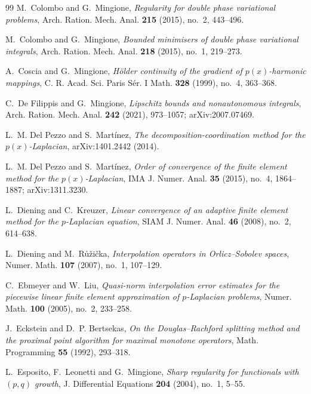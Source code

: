 \documentclass[11pt]{amsart}
\theoremstyle{definition}
\theoremstyle{remark}
\numberwithin{equation}{section}
\begin{document}
\begin{thebibliography}{99}
M.~Colombo and G.~Mingione, \emph{Regularity for double phase variational problems}, Arch. Ration. Mech. Anal. \textbf{215} (2015), no.~2, 443--496.

M.~Colombo and G.~Mingione, \emph{Bounded minimisers of double phase variational integrals}, Arch. Ration. Mech. Anal. \textbf{218} (2015), no.~1, 219--273.

A.~Coscia and G.~Mingione, \emph{H\"older continuity of the gradient of $p(x)$-harmonic mappings}, C. R. Acad. Sci. Paris S\'er. I Math. \textbf{328} (1999), no.~4, 363--368.

C.~De Filippis and G.~Mingione, \emph{Lipschitz bounds and nonautonomous integrals}, Arch. Ration. Mech. Anal. \textbf{242} (2021), 973--1057; arXiv:2007.07469.

L.~M. Del Pezzo and S.~Mart\'inez, \emph{The decomposition-coordination method for the $p(x)$-Laplacian}, arXiv:1401.2442 (2014).

L.~M. Del Pezzo and S.~Mart\'inez, \emph{Order of convergence of the finite element method for the $p(x)$-Laplacian}, IMA J. Numer. Anal. \textbf{35} (2015), no.~4, 1864--1887; arXiv:1311.3230.

L.~Diening and C.~Kreuzer, \emph{Linear convergence of an adaptive finite element method for the $p$-Laplacian equation}, SIAM J. Numer. Anal. \textbf{46} (2008), no.~2, 614--638.

L.~Diening and M.~R\r{u}\v{z}i\v{c}ka, \emph{Interpolation operators in Orlicz--Sobolev spaces}, Numer. Math. \textbf{107} (2007), no.~1, 107--129.

C.~Ebmeyer and W.~Liu, \emph{Quasi-norm interpolation error estimates for the piecewise linear finite element approximation of $p$-Laplacian problems}, Numer. Math. \textbf{100} (2005), no.~2, 233--258.

J.~Eckstein and D.~P. Bertsekas, \emph{On the Douglas--Rachford splitting method and the proximal point algorithm for maximal monotone operators}, Math. Programming \textbf{55} (1992), 293--318.

L.~Esposito, F.~Leonetti and G.~Mingione, \emph{Sharp regularity for functionals with $(p,q)$ growth}, J. Differential Equations \textbf{204} (2004), no.~1, 5--55.


\end{thebibliography}
\end{document}
